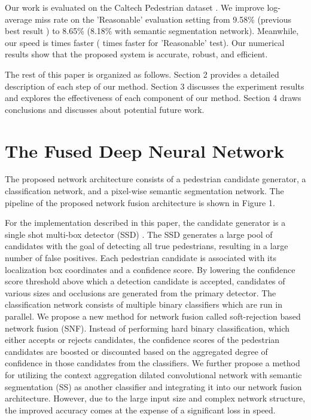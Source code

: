 \documentclass[10pt,letterpaper]{article}
\begin{document}
Our work is evaluated on the Caltech Pedestrian dataset \cite{caltech}. We improve log-average miss rate on the 'Reasonable' evaluation setting from 9.58\% (previous best result \cite{rpn}) to 8.65\% (8.18\% with semantic segmentation network). Meanwhile, our speed is  times faster ( times faster for 'Reasonable' test). Our numerical results show that the proposed system is accurate, robust, and efficient. 

The rest of this paper is organized as follows. Section 2 provides a detailed description of each step of our method. Section 3 discusses the experiment results and explores the effectiveness of each component of our method. Section 4 draws conclusions and discusses about potential future work.


\section{The Fused Deep Neural Network}
The proposed network architecture consists of a pedestrian candidate generator, a classification network, and a pixel-wise semantic segmentation network. The pipeline of the proposed network fusion architecture is shown in Figure 1.

For the implementation described in this paper, the candidate generator is a single shot multi-box detector (SSD) \cite{SSD}. The SSD generates a large pool of candidates with the goal of detecting all true pedestrians, resulting in a large number of false positives. Each pedestrian candidate is associated with its localization box coordinates and a confidence score. By lowering the confidence score threshold above which a detection candidate is accepted, candidates of various sizes and occlusions are generated from the primary detector. The classification network consists of multiple binary classifiers which are run in parallel. We propose a new method for network fusion called soft-rejection based network fusion (SNF). Instead of performing hard binary classification, which either accepts or rejects candidates, the confidence scores of the pedestrian candidates are boosted or discounted based on the aggregated degree of confidence in those candidates from the classifiers. We further propose a method for utilizing the context aggregation dilated convolutional network with semantic segmentation (SS) as another classifier and integrating it into our network fusion architecture. However, due to the large input size and complex network structure, the improved accuracy comes at the expense of a significant loss in speed.
\end{document}
